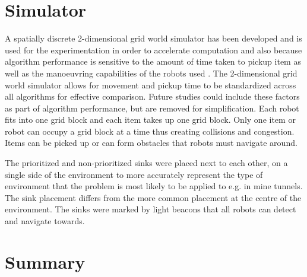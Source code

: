 \section{Simulator}
A spatially discrete 2-dimensional grid world simulator has been developed and is used for the experimentation in order to accelerate computation \cite{sugawara2002swarming} and also because algorithm performance is sensitive to the amount of time taken to pickup item as well as the manoeuvring capabilities of the robots used \cite{ostergaard2001emergent}. The 2-dimensional grid world simulator allows for movement and pickup time to be standardized across all algorithms for effective comparison. Future studies could include these factors as part of algorithm performance, but are removed for simplification. Each robot fits into one grid block and each item takes up one grid block. Only one item or robot can occupy a grid block at a time thus creating collisions and congestion. Items can be picked up or can form obstacles that robots must navigate around.

The prioritized and non-prioritized sinks were placed next to each other, on a single side of the environment to more accurately represent the type of environment that the problem is most likely to be applied to e.g. in mine tunnels. The sink placement differs from the more common placement at the centre of the environment. The sinks were marked by light beacons that all robots can detect and navigate towards.


\section{Summary}
\label{robots:summary}

